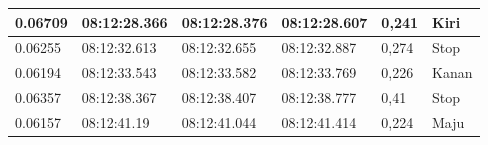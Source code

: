 \begin{longtable}{|l|l|l|l|l|l|}
  0.06709                                                                                                 & 08:12:28.366                                                                                           & 08:12:28.376                                                                                               & 08:12:28.607                                                                                            & 0,241                                              & Kiri                                              \\ \hline
  0.06255                                                                                                 & 08:12:32.613                                                                                           & 08:12:32.655                                                                                               & 08:12:32.887                                                                                            & 0,274                                              & Stop                                              \\ \hline
  0.06194                                                                                                 & 08:12:33.543                                                                                           & 08:12:33.582                                                                                               & 08:12:33.769                                                                                            & 0,226                                              & Kanan                                             \\ \hline
  0.06357                                                                                                 & 08:12:38.367                                                                                           & 08:12:38.407                                                                                               & 08:12:38.777                                                                                            & 0,41                                               & Stop                                              \\ \hline
  0.06157                                                                                                 & 08:12:41.19                                                                                            & 08:12:41.044                                                                                               & 08:12:41.414                                                                                            & 0,224                                              & Maju                                              \\ \hline

\end{longtable}
